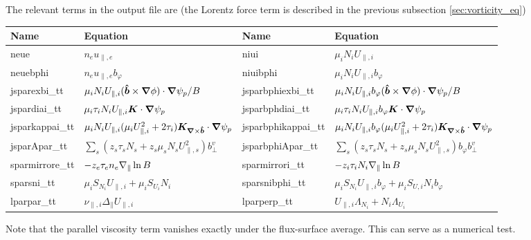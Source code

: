The relevant terms in the output file are (the Lorentz force term is described in the previous subsection \ref{sec:vorticity_eq})
\begin{longtable}{llll}
\toprule
\rowcolor{gray!50}\textbf{Name} &  \textbf{Equation} &
\textbf{Name} &  \textbf{Equation}\\
\midrule
    neue &$n_e u_{\parallel,e}$ &
    niui &$\mu_i N_i U_{\parallel,i}$ \\
    neuebphi &$n_eu_{\parallel,e}b_\varphi$ &
    niuibphi &$\mu_i N_iU_{\parallel,i}b_\varphi$ \\
    jsparexbi\_tt       & $\mu_i N_iU_{\parallel,i}(\bm{\hat{b}}\times{\boldsymbol{\nabla}}\phi)\cdot{\boldsymbol{\nabla}} \psi_p/B$ &
    jsparbphiexbi\_tt   & $\mu_i N_iU_{\parallel,i}b_\varphi(\bm{\hat{b}}\times{\boldsymbol{\nabla}}\phi)\cdot{\boldsymbol{\nabla}} \psi_p/B$ \\
    jspardiai\_tt       & $\mu_i \tau_i N_iU_{\parallel,i}{\boldsymbol{K}}\cdot{\boldsymbol{\nabla}}\psi_p$ &
    jsparbphdiai\_tt   & $\mu_i \tau_i N_iU_{\parallel,i}b_\varphi{\boldsymbol{K}}\cdot{\boldsymbol{\nabla}}\psi_p$ \\
    jsparkappai\_tt       & $\mu_i N_iU_{\parallel,i} ( \mu_i U_{\parallel,i}^2 + 2\tau_i){\boldsymbol{K}}_{{\boldsymbol{\nabla}}\times \bm{\hat{b}}}\cdot{\boldsymbol{\nabla}}\psi_p$ &
    jsparbphikappai\_tt       & $\mu_i N_iU_{\parallel,i}b_\varphi ( \mu_i U_{\parallel,i}^2 + 2\tau_i){\boldsymbol{K}}_{{\boldsymbol{\nabla}}\times \bm{\hat{b}}}\cdot{\boldsymbol{\nabla}}\psi_p$ \\
    jsparApar\_tt       & $\sum_s (z_s \tau_s N_s + z_s \mu_s N_s U_{\parallel,s}^2)b_\perp^v$ &
    jsparbphiApar\_tt   & $\sum_s (z_s \tau_s N_s + z_s \mu_s N_s U_{\parallel,s}^2)b_\varphi b_\perp^v$ \\
    sparmirrore\_tt & $-z_e\tau_en_e\nabla_\parallel \ln B$ &
    sparmirrori\_tt & $-z_i\tau_iN_i\nabla_\parallel \ln B$ \\
    sparsni\_tt & $\mu_i S_{N_i} U_{\parallel,i} + \mu_i S_{U_i} N_i $ &
    sparsnibphi\_tt & $\mu_i S_{N_i} U_{\parallel,i}b_\varphi + \mu_i S_{U,i} N_i b_\varphi $ \\
    lparpar\_tt   & $\nu_{\parallel,i} \Delta_\parallel U_{\parallel,i}$ &
    lparperp\_tt & $U_{\parallel,i} \Lambda_{N_i} + N_i\Lambda_{U_i} $ \\
\bottomrule
\end{longtable}
Note that the parallel viscosity term vanishes exactly under the flux-surface average. This can serve as a numerical test.


